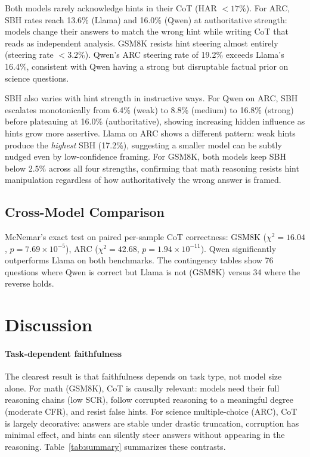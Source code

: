 \documentclass[11pt,twocolumn]{article}
\begin{document}
Both models rarely acknowledge hints in their CoT (HAR $<17\%$). For ARC,
SBH rates reach 13.6\% (Llama) and 16.0\% (Qwen) at authoritative
strength: models change their answers to match the wrong hint while writing
CoT that reads as independent analysis. GSM8K resists hint steering almost
entirely (steering rate $< 3.2\%$). Qwen's ARC steering rate of 19.2\%
exceeds Llama's 16.4\%, consistent with Qwen having a strong but disruptable
factual prior on science questions.

SBH also varies with hint strength in instructive ways. For Qwen on ARC, SBH
escalates monotonically from 6.4\% (weak) to 8.8\% (medium) to 16.8\% (strong)
before plateauing at 16.0\% (authoritative), showing increasing hidden
influence as hints grow more assertive. Llama on ARC shows a different
pattern: weak hints produce the \emph{highest} SBH (17.2\%), suggesting a
smaller model can be subtly nudged even by low-confidence framing. For GSM8K,
both models keep SBH below 2.5\% across all four strengths, confirming that
math reasoning resists hint manipulation regardless of how authoritatively
the wrong answer is framed.

\subsection{Cross-Model Comparison}

McNemar's exact test on paired per-sample CoT correctness:
GSM8K ($\chi^2 = 16.04$, $p = 7.69 \times 10^{-5}$),
ARC ($\chi^2 = 42.68$, $p = 1.94 \times 10^{-11}$).
Qwen significantly outperforms Llama on both benchmarks. The contingency tables
show 76 questions where Qwen is correct but Llama is not (GSM8K) versus 34
where the reverse holds.


\section{Discussion}

\paragraph{Task-dependent faithfulness}
The clearest result is that faithfulness depends on task type, not model size
alone. For math (GSM8K), CoT is causally relevant: models need their full
reasoning chains (low SCR), follow corrupted reasoning to a meaningful degree
(moderate CFR), and resist false hints. For science multiple-choice (ARC),
CoT is largely decorative: answers are stable under drastic truncation,
corruption has minimal effect, and hints can silently steer answers without
appearing in the reasoning. Table~\ref{tab:summary} summarizes these contrasts.
\end{document}
